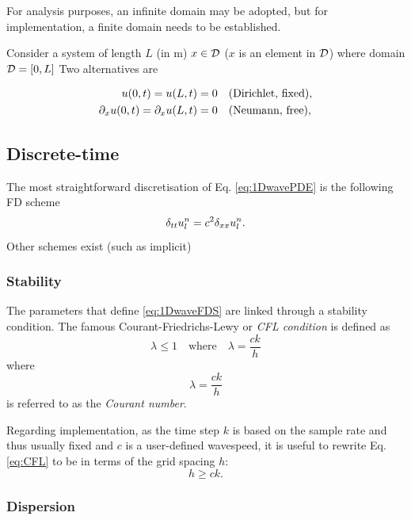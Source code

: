 For analysis purposes, an infinite domain may be adopted, but for implementation, a finite domain needs to be established. 

Consider a system of length $L$ (in m) $x\in \mathcal{D}$ ($x$ is an element in $\mathcal{D}$) where domain $\mathcal{D} = [0, L]$
Two alternatives are

\begin{subequations}\label{eq:boundaryCond1DWave}
    \begin{align}
        u(0, t) = u(L, t) &= 0\quad \text{(Dirichlet, fixed)},\label{eq:contDirichlet}\\
        \partial_x u(0, t) = \partial_x u(L, t) &= 0\quad \text{(Neumann, free)},\label{eq:contNeumann}
    \end{align}
\end{subequations}

\subsection{Discrete-time}
The most straightforward discretisation of Eq. \eqref{eq:1DwavePDE} is the following FD scheme
\begin{equation}\label{eq:1DwaveFDS}
    \delta_{tt} u_l^n = c^2 \delta_{xx} u_l^n.
\end{equation}
Other schemes exist (such as implicit)
\subsubsection{Stability}
The parameters that define \eqref{eq:1DwaveFDS} are linked through a stability condition. The famous Courant-Friedrichs-Lewy or \textit{CFL condition} is defined as \cite{courant} 
\begin{equation}\label{eq:CFL}
    \lambda \leq 1 \quad \text{where} \quad \lambda = \frac{ck}{h}
\end{equation}
where
\begin{equation}\label{eq:courantNumber}
    \lambda = \frac{ck}{h}
\end{equation}
is referred to as the \textit{Courant number}.

Regarding implementation, as the time step $k$ is based on the sample rate and thus usually fixed and $c$ is a user-defined wavespeed, it is useful to rewrite Eq. \eqref{eq:CFL} to be in terms of the grid spacing $h$:
\begin{equation}
    h \geq ck.
\end{equation}
\subsubsection{Dispersion}

